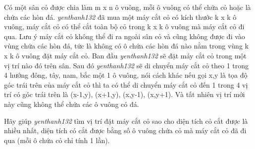 Có một sân cỏ được chia làm m x n ô vuông, mỗi ô vuông có thể chứa cỏ hoặc là chứa các hòn đá.   \emph{    yenthanh132   }   đã mua một máy cắt cỏ có kích thước k x k ô vuông, máy cắt cỏ có thể cắt toàn bộ cỏ trong k x k ô vuông mà máy cắt cỏ đi qua. Lưu ý máy cắt cỏ không thể đi ra ngoài sân cỏ và cũng không được đi vào vùng chứa các hòn đá, tức là không có ô chứa các hòn đá nào nằm trong vùng k x k ô vuông đặt máy cắt cỏ. Ban đầu   \emph{    yenthanh132   }   sẽ đặt máy cắt cỏ trong một vị trí nào đó trên sân. Sau đó   \emph{    yenthanh132   }   sẽ di chuyển máy cắt cỏ theo 1 trong 4 hướng đông, tây, nam, bắc một 1 ô vuông, nói cách khác nếu gọi x,y là tọa độ góc trái trên của máy cắt cỏ thì ta có thể di chuyển máy cắt cỏ đến 1 trong 4 vị trí có góc trái trên là (x-1,y), (x+1,y), (x,y-1), (x,y+1). Và tất nhiên vị trí mới này cũng không thể chứa các ô vuông có đá.  

   Hãy giúp   \emph{    yenthanh132   }   tìm vị trí đặt máy cắt cỏ sao cho diện tích cỏ cắt được là nhiều nhất, diện tích có cắt được bằng số ô vuông chứa cỏ mà máy cắt cỏ đã đi qua (mỗi ô chứa cỏ chỉ tính 1 lần).